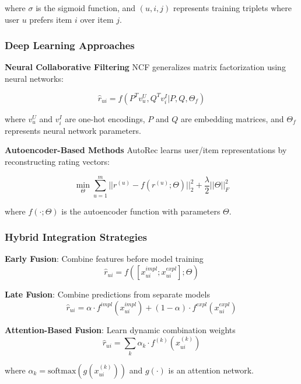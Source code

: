 where $\sigma$ is the sigmoid function, and $(u,i,j)$ represents training triplets where user $u$ prefers item $i$ over item $j$.

\subsubsection{Deep Learning Approaches}

\textbf{Neural Collaborative Filtering}
NCF generalizes matrix factorization using neural networks:

\begin{equation}
\hat{r}_{ui} = f(P^T v_u^U, Q^T v_i^I | P, Q, \Theta_f)
\end{equation}

where $v_u^U$ and $v_i^I$ are one-hot encodings, $P$ and $Q$ are embedding matrices, and $\Theta_f$ represents neural network parameters.

\textbf{Autoencoder-Based Methods}
AutoRec learns user/item representations by reconstructing rating vectors:

\begin{equation}
\min_{\Theta} \sum_{u=1}^m ||r^{(u)} - f(r^{(u)}; \Theta)||_2^2 + \frac{\lambda}{2}||\Theta||_F^2
\end{equation}

where $f(\cdot; \Theta)$ is the autoencoder function with parameters $\Theta$.

\subsubsection{Hybrid Integration Strategies}

\textbf{Early Fusion}: Combine features before model training
\begin{equation}
\hat{r}_{ui} = f([x_{ui}^{impl}; x_{ui}^{expl}]; \Theta)
\end{equation}

\textbf{Late Fusion}: Combine predictions from separate models
\begin{equation}
\hat{r}_{ui} = \alpha \cdot f^{impl}(x_{ui}^{impl}) + (1-\alpha) \cdot f^{expl}(x_{ui}^{expl})
\end{equation}

\textbf{Attention-Based Fusion}: Learn dynamic combination weights
\begin{equation}
\hat{r}_{ui} = \sum_k \alpha_k \cdot f^{(k)}(x_{ui}^{(k)})
\end{equation}

where $\alpha_k = \text{softmax}(g(x_{ui}^{(k)}))$ and $g(\cdot)$ is an attention network.

